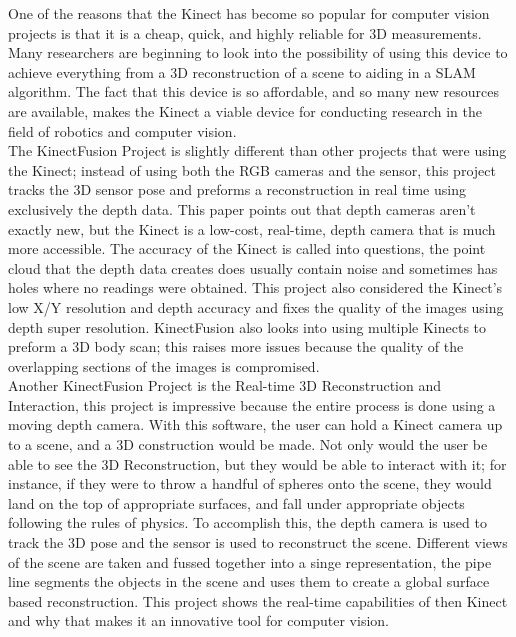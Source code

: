 \documentclass[12pt,twocolumn]{article}
\begin{document}
\begin{description}
One of the reasons that the Kinect has become so popular for computer vision projects is that it is a cheap, quick, and highly reliable for 3D measurements. Many researchers are beginning to look into the possibility of using this device to achieve everything from a 3D reconstruction of a scene to aiding in a SLAM algorithm. The fact that this device is so affordable, and so many new resources are available, makes the Kinect a viable device for conducting research in the field of robotics and computer vision.\\
\indent The KinectFusion Project is slightly different than other projects that were using the Kinect; instead of using both the RGB cameras and the sensor, this project tracks the 3D sensor pose and preforms a reconstruction in real time using exclusively the depth data. This paper points out that depth cameras aren't exactly new, but the Kinect is a low-cost, real-time, depth camera that is much more accessible. The accuracy of the Kinect is called into questions, the point cloud that the depth data creates does usually contain noise and sometimes has holes where no readings were obtained. This project also considered the Kinect's low X/Y resolution and depth accuracy and fixes the quality of the images using depth super resolution. KinectFusion also looks into using multiple Kinects to preform a 3D body scan; this raises more issues because the quality of the overlapping sections of the images is compromised. \\
\indent	Another KinectFusion Project is the Real-time 3D Reconstruction and Interaction, this project is impressive because the entire process is done using a moving depth camera. With this software, the user can hold a Kinect camera up to a scene, and a 3D construction would be made. Not only would the user be able to see the 3D Reconstruction, but they would be able to interact with it; for instance, if they were to throw a handful of spheres onto the scene, they would land on the top of appropriate surfaces, and fall under appropriate objects following the rules of physics. To accomplish this, the depth camera is used to track the 3D pose and the sensor is used to reconstruct the scene. Different views of the scene are taken and fussed together into a singe representation, the pipe line segments the objects in the scene and uses them to create a global surface based reconstruction. This project shows the real-time capabilities of then Kinect and why that makes it an innovative tool for computer vision.\\

\end{description}
\end{document}
